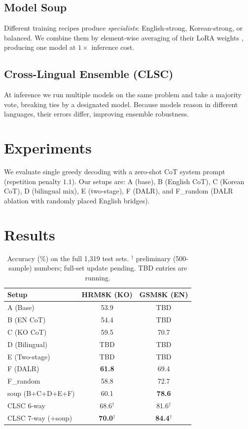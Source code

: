\documentclass[11pt]{article}
\begin{document}
\subsection{Model Soup}
\label{sec:soup}
Different training recipes produce \emph{specialists}: English-strong,
Korean-strong, or balanced. We combine them by element-wise averaging of
their LoRA weights \citep{wortsman2022soup}, producing one model at
$1\times$ inference cost.

\subsection{Cross-Lingual Ensemble (CLSC)}
\label{sec:clsc}
At inference we run multiple models on the same problem and take a
majority vote, breaking ties by a designated model. Because models
reason in different languages, their errors differ, improving ensemble
robustness.

\section{Experiments}
\label{sec:exp}
We evaluate single greedy decoding with a zero-shot CoT system prompt
(repetition penalty $1.1$). Our setups are: A (base), B (English CoT),
C (Korean CoT), D (bilingual mix), E (two-stage), F (DALR), and
F\_random (DALR ablation with randomly placed English bridges).

\section{Results}
\label{sec:results}

\begin{table}[t]
\centering
\small
\begin{tabular}{lcc}
\toprule
\textbf{Setup} & \textbf{HRM8K (KO)} & \textbf{GSM8K (EN)} \\
\midrule
A (Base)        & 53.9  & TBD   \\
B (EN CoT)      & 54.4  & TBD   \\
C (KO CoT)      & 59.5  & 70.7  \\
D (Bilingual)   & TBD   & TBD   \\
E (Two-stage)   & TBD   & TBD   \\
F (DALR)        & \textbf{61.8} & 69.4 \\
F\_random       & 58.8  & 72.7  \\
\midrule
soup (B+C+D+E+F) & 60.1 & \textbf{78.6} \\
\midrule
CLSC 6-way       & 68.6$^\dagger$ & 81.6$^\dagger$ \\
CLSC 7-way (+soup) & \textbf{70.0}$^\dagger$ & \textbf{84.4}$^\dagger$ \\
\bottomrule
\end{tabular}
\caption{Accuracy (\%) on the full 1{,}319 test sets.
$^\dagger$ preliminary (500-sample) numbers; full-set update pending.
TBD entries are running.}
\label{tab:main}
\end{table}
\end{document}
